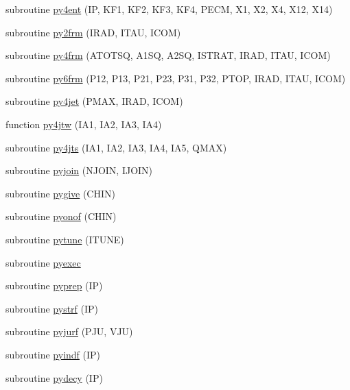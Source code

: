 \begin{DoxyCompactItemize}
\item 
subroutine \hyperlink{pythia-6_84_824_8f_a30fa8bc62ece593663313208df32aa2b}{py4ent} (IP, K\+F1, K\+F2, K\+F3, K\+F4, P\+E\+CM, X1, X2, X4, X12, X14)
\item 
subroutine \hyperlink{pythia-6_84_824_8f_a6b02d5cc105a9871f1c5ee4c46752de9}{py2frm} (I\+R\+AD, I\+T\+AU, I\+C\+OM)
\item 
subroutine \hyperlink{pythia-6_84_824_8f_a61f65c14f7304ed635d9340e3be049e1}{py4frm} (A\+T\+O\+T\+SQ, A1\+SQ, A2\+SQ, I\+S\+T\+R\+AT, I\+R\+AD, I\+T\+AU, I\+C\+OM)
\item 
subroutine \hyperlink{pythia-6_84_824_8f_a4ad3701c19e37e48400c694e52649e0f}{py6frm} (P12, P13, P21, P23, P31, P32, P\+T\+OP, I\+R\+AD, I\+T\+AU, I\+C\+OM)
\item 
subroutine \hyperlink{pythia-6_84_824_8f_a050131d873ec9273038b54fda8ccc6c1}{py4jet} (P\+M\+AX, I\+R\+AD, I\+C\+OM)
\item 
function \hyperlink{pythia-6_84_824_8f_a68f57cb4807f20b58a861f7be483cf9c}{py4jtw} (I\+A1, I\+A2, I\+A3, I\+A4)
\item 
subroutine \hyperlink{pythia-6_84_824_8f_a6035a797526aac4beb1aec91a7e87d21}{py4jts} (I\+A1, I\+A2, I\+A3, I\+A4, I\+A5, Q\+M\+AX)
\item 
subroutine \hyperlink{pythia-6_84_824_8f_aad4645f8cdf9341ed2407e47f5955fb9}{pyjoin} (N\+J\+O\+IN, I\+J\+O\+IN)
\item 
subroutine \hyperlink{pythia-6_84_824_8f_a23504218b9f527cdb0d3421ecde9852e}{pygive} (C\+H\+IN)
\item 
subroutine \hyperlink{pythia-6_84_824_8f_a945a04962dcdcfed06ffe234a5ec1880}{pyonof} (C\+H\+IN)
\item 
subroutine \hyperlink{pythia-6_84_824_8f_a5093064b30582e5e9082c351ef0d4ffe}{pytune} (I\+T\+U\+NE)
\item 
subroutine \hyperlink{pythia-6_84_824_8f_a018da81d5f23cd9c6d55f5151fb0f541}{pyexec}
\item 
subroutine \hyperlink{pythia-6_84_824_8f_aa2fbdb46f28af53ae4a8988b1f8246eb}{pyprep} (IP)
\item 
subroutine \hyperlink{pythia-6_84_824_8f_ab14f48c3190aeff08037290931944d07}{pystrf} (IP)
\item 
subroutine \hyperlink{pythia-6_84_824_8f_a5fe7258c6d0b84acd97639f5f4d66acd}{pyjurf} (P\+JU, V\+JU)
\item 
subroutine \hyperlink{pythia-6_84_824_8f_adfef7cf742e4b4fd497224fcccb14869}{pyindf} (IP)
\item 
subroutine \hyperlink{pythia-6_84_824_8f_abeadd88d3e040fcaf7b2b6e31108b30e}{pydecy} (IP)

\end{DoxyCompactItemize}
